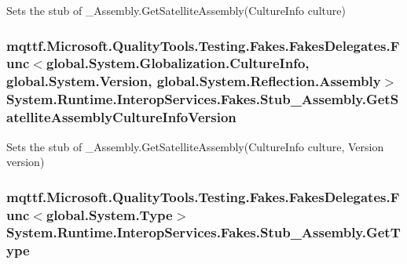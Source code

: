 Sets the stub of \-\_\-\-Assembly.\-Get\-Satellite\-Assembly(\-Culture\-Info culture)

\hypertarget{class_system_1_1_runtime_1_1_interop_services_1_1_fakes_1_1_stub___assembly_ac932f4ac90691445b6b7be931033350a}{
\subsubsection[{Get\-Satellite\-Assembly\-Culture\-Info\-Version}]{\setlength{\rightskip}{0pt plus 5cm}mqttf.\-Microsoft.\-Quality\-Tools.\-Testing.\-Fakes.\-Fakes\-Delegates.\-Func$<$global.\-System.\-Globalization.\-Culture\-Info, global.\-System.\-Version, global.\-System.\-Reflection.\-Assembly$>$ System.\-Runtime.\-Interop\-Services.\-Fakes.\-Stub\-\_\-\-Assembly.\-Get\-Satellite\-Assembly\-Culture\-Info\-Version}}\label{class_system_1_1_runtime_1_1_interop_services_1_1_fakes_1_1_stub___assembly_ac932f4ac90691445b6b7be931033350a}


Sets the stub of \-\_\-\-Assembly.\-Get\-Satellite\-Assembly(\-Culture\-Info culture, Version version)

\hypertarget{class_system_1_1_runtime_1_1_interop_services_1_1_fakes_1_1_stub___assembly_a7301af6918525d4a463f27e1b6423bf6}{
\subsubsection[{Get\-Type}]{\setlength{\rightskip}{0pt plus 5cm}mqttf.\-Microsoft.\-Quality\-Tools.\-Testing.\-Fakes.\-Fakes\-Delegates.\-Func$<$global.\-System.\-Type$>$ System.\-Runtime.\-Interop\-Services.\-Fakes.\-Stub\-\_\-\-Assembly.\-Get\-Type}}\label{class_system_1_1_runtime_1_1_interop_services_1_1_fakes_1_1_stub___assembly_a7301af6918525d4a463f27e1b6423bf6}


